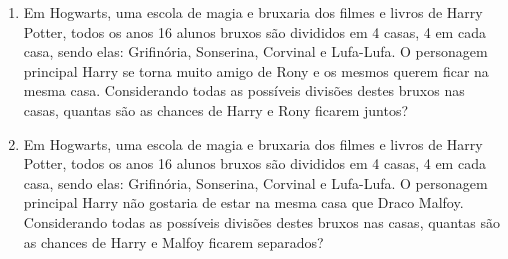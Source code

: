 \begin{enumerate}
\item Em Hogwarts, uma escola de magia e bruxaria dos filmes e livros de Harry Potter, todos os anos 16 alunos bruxos são divididos em 4 casas, 4 em cada casa, sendo elas: Grifinória, Sonserina, Corvinal e Lufa-Lufa. O personagem principal Harry se torna muito amigo de Rony e os mesmos querem ficar na mesma casa.  Considerando todas as possíveis divisões destes bruxos nas casas, quantas são as chances de Harry e Rony ficarem juntos?

 \item Em Hogwarts, uma escola de magia e bruxaria dos filmes e livros de Harry Potter, todos os anos 16 alunos bruxos são divididos em 4 casas, 4 em cada casa, sendo elas: Grifinória, Sonserina, Corvinal e Lufa-Lufa. O personagem principal Harry não gostaria de estar na mesma casa que  Draco Malfoy. Considerando todas as possíveis divisões destes bruxos nas casas, quantas são as chances de Harry e Malfoy ficarem separados?
\end{enumerate}

\ifnum{}
\clearpage
\else
\notasfinais
\fi




\nocite{*}